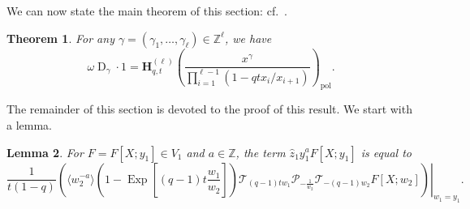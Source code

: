 \documentclass[reqno]{amsart}
\theoremstyle{plain}
\newtheorem{theorem}{Theorem}[section]
\newtheorem{lemma}[theorem]{Lemma}
\theoremstyle{definition}
\theoremstyle{remark}
\DeclareMathOperator{\D}{D}
\DeclareMathOperator{\Exp}{Exp}
\newcommand{\z}{\widehat{z}}
\newcommand{\<}{\langle}
\renewcommand{\>}{\rangle}
\begin{document}
We can now state the main theorem of this section: cf.\ \cite[Corollary~3.7.2]{BHMPS2023ShuffleAnyLine}.
\begin{theorem}
    \label{thm:Don1}
    For any $\gamma=(\gamma_1,\dots,\gamma_{\ell})\in \mathbb{Z}^{\ell}$, we have
    \[\omega \D_\gamma \cdot 1 = \mathbf{H}_{q,t}^{(\ell)}\left(\frac{x^\gamma}{\prod_{i=1}^{\ell-1}(1-qt x_i/x_{i+1})}\right)_{\mathrm{pol}}.\]
\end{theorem}

The remainder of this section is devoted to the proof of this result. We start with a lemma.

\begin{lemma}
    \label{lemma:z1y1a}
    For $F = F[X;y_1]\in V_1$ and $a \in \mathbb{Z}$, the term $\z_1 y_1^a F[X;y_1]$ is equal to
    \[ \left. \frac{1}{t(1-q)}\left(\langle w_2^{-a} \rangle \left(1-\Exp\left[(q-1)t\frac{w_1}{w_2}\right] \right) \mathcal{T}_{(q-1)tw_1}\mathcal{P}_{-\frac{1}{w_2}} \mathcal{T}_{-(q-1)w_2}F[X;w_2]\right)\right\rvert_{w_1=y_1}. \]
\end{lemma}
\end{document}
